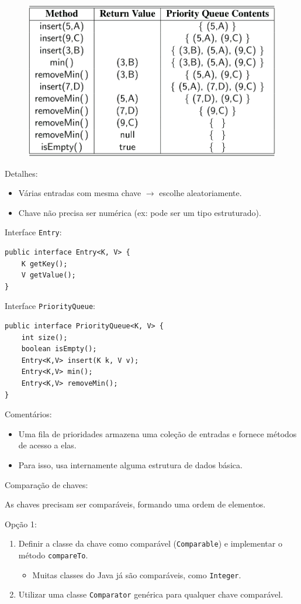 \medskip

\begin{figure}[H]
	\centering
	\includegraphics[width=0.6\linewidth]{img/table-9-1}
\end{figure}

{\color{redtext}
Detalhes:
\begin{itemize}
	\item Várias entradas com mesma chave $\to$ escolhe aleatoriamente.
	\item Chave não precisa ser numérica (ex: pode ser um tipo estruturado).
\end{itemize}
}

\medskip

Interface \texttt{Entry}:
\begin{verbatim}
public interface Entry<K, V> {
	K getKey();
	V getValue();
}
\end{verbatim}

\medskip

Interface \texttt{PriorityQueue}:
\begin{verbatim}
public interface PriorityQueue<K, V> {
	int size();
	boolean isEmpty();
	Entry<K,V> insert(K k, V v);
	Entry<K,V> min();
	Entry<K,V> removeMin();
}
\end{verbatim}

\medskip

{\color{redtext}
Comentários:
\begin{itemize}
	\item Uma fila de prioridades armazena uma coleção de entradas e fornece métodos de acesso a elas.
	\item Para isso, usa internamente alguma estrutura de dados básica.
\end{itemize}
}

\bigskip

Comparação de chaves:
\begin{itemize}
	{\color{redtext}\item As chaves precisam ser comparáveis, formando uma ordem de elementos.}
	\item Opção 1:
	\begin{enumerate}
		\item Definir a classe da chave como comparável (\texttt{Comparable}) e implementar o método \texttt{compareTo}.
		{\color{redtext}
		\begin{itemize}
			\item Muitas classes do Java já são comparáveis, como \texttt{Integer}.
		\end{itemize}
		}
		\item Utilizar uma classe \texttt{Comparator} genérica para qualquer chave comparável.
	\end{enumerate}
\end{itemize}

